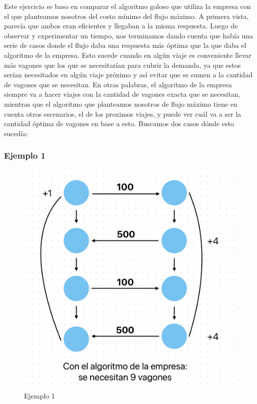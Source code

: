 \documentclass{article}
\begin{document}
    Este ejercicio se baso en comparar el algoritmo goloso que utiliza la empresa con el que planteamos nosotros del costo mínimo del flujo máximo. A primera vista, parecía que ambos eran eficientes y llegaban a la misma respuesta. Luego de observar y experimentar un tiempo, nos terminamos dando cuenta que había una serie de casos donde el flujo daba una respuesta más óptima que la que daba el algoritmo de la empresa. Esto sucede cuando en algún viaje es conveniente llevar más vagones que los que se necesitarían para cubrir la demanda, ya que estos serían necesitados en algún viaje próximo y así evitar que se sumen a la cantidad de vagones que se necesitan. En otras palabras, el algoritmo de la empresa siempre va a hacer viajes con la cantidad de vagones exacta que se necesitan, mientras que el algoritmo que planteamos nosotros de flujo máximo tiene en cuenta otros escenarios, el de los proximos viajes, y puede ver cuál va a ser la cantidad óptima de vagones en base a esto. Buscamos dos casos dónde esto sucedía:
    
    \subsubsection{Ejemplo 1}

\begin{figure}[h!]
    \raggedright
    \centering

    \includegraphics[scale=0.35]{im1.png}
    \caption{Ejemplo 1}

    \label{fig:ejemplo}
\end{figure}
\end{document}
